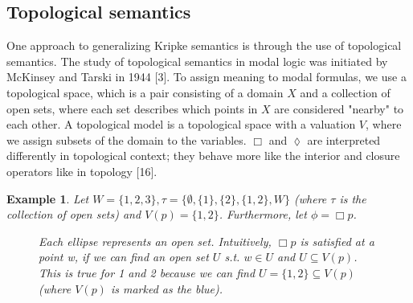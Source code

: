 \documentclass[12pt, a4paper]{scrartcl}
\newtheorem{example}[definition]{Example}
\begin{document}
\subsection{Topological semantics} One approach to generalizing Kripke semantics is through the use of topological semantics.
The study of topological semantics in modal logic was initiated by McKinsey and Tarski in 1944 [3]. To assign meaning to modal formulas, we use a topological space, which is a pair consisting of a domain 
$X$ and a collection of open sets, where each set describes which points in $X$ are considered "nearby" to each other. A topological model is a topological space with a valuation $V$, where we assign
subsets of the domain to the variables. $\Box$ and $\lozenge$ are interpreted differently in topological context; they behave more like the interior and closure operators like in topology [16]. 

\begin{example}
    Let $ W = \{1,2,3\}, \tau = \{\emptyset, \{1\}, \{2\}, \{1,2\}, W\}$ (where $\tau$ is the collection of open sets) and $V(p) = \{1,2\}$. Furthermore, let $\phi = \Box p$.
    \begin{figure}[h]
        \centering
        \caption{Each ellipse represents an open set. Intuitively, $\Box p$ is satisfied at a point w, if we can find an open set $U$ s.t. 
        $w \in U$ and $U \subseteq V(p)$. This is true for 1 and 2 because we can find $U = \{1,2\} \subseteq V(p)$ (where $V(p)$ is marked as the blue).}
    \end{figure}
\end{example}
\end{document}
